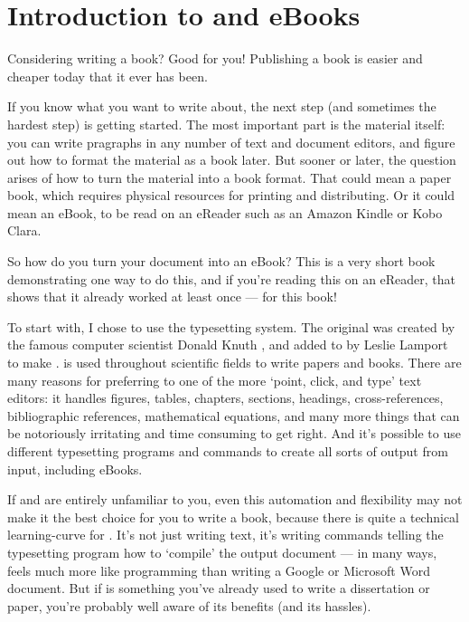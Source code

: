 
\chapter{Introduction to \latex and eBooks}

Considering writing a book? Good for you! Publishing a book is easier and cheaper today 
that it ever has been. 

If you know what you want to write about, the next step (and sometimes the 
hardest step) is getting started. The most important part is the material itself: 
you can write pragraphs in any number of text and document editors, 
and figure out how to format the material as a book later. But sooner or later, 
the question arises of how to turn the material into a book format. That could mean a paper book, 
which requires physical resources for printing and distributing. Or it could mean
an eBook, to be read on an eReader such as an Amazon Kindle or Kobo Clara.

So how do you turn your document into an eBook? This is a very short book demonstrating one 
way to do this, and if you're reading this on an eReader, that shows
that it already worked at least once --- for this book!

To start with, I chose to use the \latex typesetting system. 
The original \tex was created by the famous computer scientist Donald Knuth \citep{knuth1984texbook},
and added to by Leslie Lamport to make \latex \citep{lamport1985latex}.
\latex is used throughout scientific fields to write papers and books. There are many
reasons for preferring \latex to one of the more `point, click, and type' text editors:
it handles figures, tables, chapters, sections, headings, cross-references, 
bibliographic references, mathematical equations, and many more things that can be 
notoriously irritating and time consuming to get right. And it's possible to use different typesetting
programs and commands to create all sorts of output from \latex input, including eBooks.

If \tex and \latex are entirely unfamiliar to you, even this automation and flexibility 
may not make it the best choice for you to write a book, because there is quite a technical 
learning-curve for \latex. It's not just writing text, it's writing commands telling the
typesetting program how to `compile' the output document --- in many ways, \latex
feels much more like programming than writing a Google or Microsoft Word document. But if
\latex is something you've already used to write a dissertation or paper, you're 
probably well aware of its benefits (and its hassles). 

